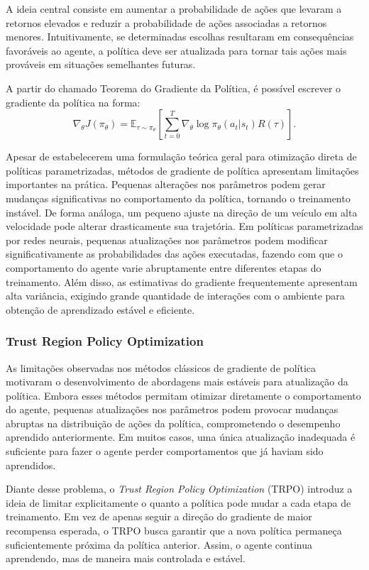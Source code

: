 A ideia central consiste em aumentar a probabilidade de ações que levaram a retornos elevados e reduzir a probabilidade de ações associadas a retornos menores. Intuitivamente, se determinadas escolhas resultaram em consequências favoráveis ao agente, a política deve ser atualizada para tornar tais ações mais prováveis em situações semelhantes futuras.

A partir do chamado Teorema do Gradiente da Política, é possível escrever o gradiente da política na forma:
$$
\nabla_\theta J(\pi_\theta)
=
\mathbb{E}_{\tau \sim \pi_\theta}
\left[
\sum_{t=0}^{T}
\nabla_\theta \log \pi_\theta(a_t|s_t)
R(\tau)
\right].
$$

Apesar de estabelecerem uma formulação teórica geral para otimização direta de políticas parametrizadas, métodos de gradiente de política apresentam limitações importantes na prática. Pequenas alterações nos parâmetros podem gerar mudanças significativas no comportamento da política, tornando o treinamento instável. De forma análoga, um pequeno ajuste na direção de um veículo em alta velocidade pode alterar drasticamente sua trajetória. Em políticas parametrizadas por redes neurais, pequenas atualizações nos parâmetros podem modificar significativamente as probabilidades das ações executadas, fazendo com que o comportamento do agente varie abruptamente entre diferentes etapas do treinamento. Além disso, as estimativas do gradiente frequentemente apresentam alta variância, exigindo grande quantidade de interações com o ambiente para obtenção de aprendizado estável e eficiente.

\subsubsection{Trust Region Policy Optimization}

As limitações observadas nos métodos clássicos de gradiente de política motivaram o desenvolvimento de abordagens mais estáveis para atualização da política. Embora esses métodos permitam otimizar diretamente o comportamento do agente, pequenas atualizações nos parâmetros podem provocar mudanças abruptas na distribuição de ações da política, comprometendo o desempenho aprendido anteriormente. Em muitos casos, uma única atualização inadequada é suficiente para fazer o agente perder comportamentos que já haviam sido aprendidos.

Diante desse problema, o \textit{Trust Region Policy Optimization} (TRPO) \cite{trpo} introduz a ideia de limitar explicitamente o quanto a política pode mudar a cada etapa de treinamento. Em vez de apenas seguir a direção do gradiente de maior recompensa esperada, o TRPO busca garantir que a nova política permaneça suficientemente próxima da política anterior. Assim, o agente continua aprendendo, mas de maneira mais controlada e estável.

